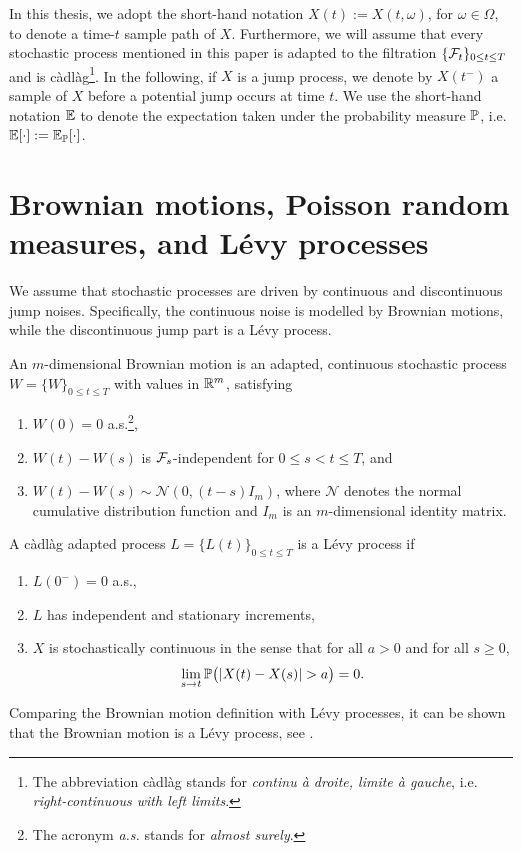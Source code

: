 In this thesis, we adopt the short-hand notation $X(t):=X(t,\omega)$, for $\omega \in \Omega$, to denote a time-$t$ sample path of $X$. Furthermore, we will assume that every stochastic process mentioned in this paper is adapted to the filtration $\{\mathcal{F}_t\}_{0 \leq t \leq T}$ and is càdlàg\footnote{The abbreviation càdlàg stands for \emph{continu à droite, limite à gauche}, i.e. \emph{right-continuous with left limits}.}. In the following, if $X$ is a jump process, we denote by $X(t^-)$ a sample of $X$ before a potential jump occurs at time $t$. We use the short-hand notation $\mathbb{E}$ to denote the expectation taken under the probability measure $\mathbb{P}$, i.e. $\mathbb{E}[\cdot] := \mathbb{E}_{\mathbb{P}} [\cdot]$.

\section{Brownian motions, Poisson random measures, and Lévy processes}
\label{section: Brownian motions, Poisson random measures, and Lévy processes}
We assume that stochastic processes are driven by continuous and discontinuous jump noises. Specifically, the continuous noise is modelled by Brownian motions, while the discontinuous jump part is a Lévy process. 

\begin{definition}
    An $m$-dimensional Brownian motion is an adapted, continuous stochastic process $W=\{W\}_{0 \leq t \leq T}$ with values in $\mathbb{R}^m$, satisfying
    \begin{enumerate}[label=(\roman*)]
        \item $W(0) = 0$ a.s.\footnote{The acronym \textit{a.s.} stands for \textit{almost surely}.},
        \item $W(t)-W(s)$ is $\mathcal{F}_s$-independent for $0\leq s < t \leq T$, and
        \item $W(t)-W(s) \sim \mathcal{N}(0, (t-s)I_m)$, where $\mathcal N$ denotes the normal cumulative distribution function and $I_m$ is an $m$-dimensional identity matrix. 
    \end{enumerate}
\end{definition}
\begin{definition}
\label{def: Lévy process}
    A càdlàg adapted process $L=\{L(t)\}_{0 \leq t \leq T}$ is a Lévy process if 
    \begin{enumerate}[label=(\roman*)]
        \item $L(0^-)=0$ a.s.,
        \item $L$ has independent and stationary increments,
        \item $X$ is stochastically continuous in the sense that for all $a>0$ and for all $s\geq 0$,
        \begin{equation*}
            \lim_{s \rightarrow t} \Prob \big( |X(t)-X(s)|>a \big) = 0.
        \end{equation*}
    \end{enumerate}
\end{definition}
Comparing the Brownian motion definition with Lévy processes, it can be shown that the Brownian motion is a Lévy process, see \cite[Example 1.3.8]{applebaum2009levy}.

